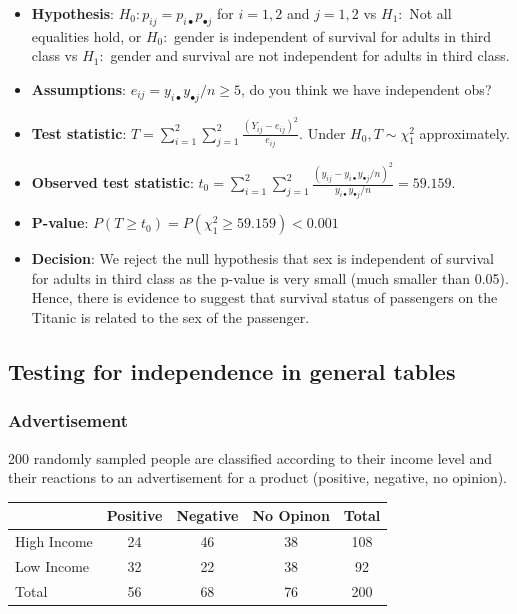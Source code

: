 \documentclass[a4paper]{article}
\begin{document}
\begin{itemize}
	\item \textbf{Hypothesis}: \( H_0: p_{ij} = p_{i \bullet} p_{\bullet j} \) for \( i = 1,2 \) and \( j = 1,2 \) vs \( H_1: \) Not all equalities hold, or \( H_0: \) gender is independent of survival for adults in third class vs \( H_1: \)  gender and survival are not independent for adults in third class. 
	\item \textbf{Assumptions}: \( e_{ij} =y_{i \bullet} y_{\bullet j}/n \geq 5 \), do you think we have independent obs?
	\item \textbf{Test statistic}: \( T = \sum\limits_{i=1}^{2}\sum\limits_{j=1}^{2} \frac{(Y_{ij} - e_{ij})^2}{e_{ij}} \). Under \( H_0, T \sim \chi^2_1 \) approximately.
	\item \textbf{Observed test statistic}: \( t_0 = \sum\limits_{i=1}^{2} \sum\limits_{j=1}^{2} \frac{(y_{ij} - y_{i \bullet}y_{\bullet j}/n)^2}{y_{i \bullet}y_{\bullet j}/n} = 59.159 \).
	\item \textbf{P-value}: \( P(T\geq t_0) = P(\chi^2_1 \geq 59.159) < 0.001 \)
	\item \textbf{Decision}: We reject the null hypothesis that sex is independent of survival for adults in third class as the p-value is very small (much smaller than 0.05). Hence, there is evidence to suggest that survival status of passengers on the Titanic is related to the sex of the passenger.
\end{itemize}
\subsection{Testing for independence in general tables}
\subsubsection{Advertisement}
200 randomly sampled people are classified according to their income level and their reactions to an advertisement for a product (positive, negative, no opinion).
\begin{table}[H]
	\centering
	\begin{tabular}{@{}lccc|c@{}}
	\toprule
				& Positive & Negative & No Opinon & Total \\ \midrule
	High Income & 24       & 46       & 38        & 108   \\
	Low Income  & 32       & 22       & 38        & 92    \\ \midrule
	Total		& 56       & 68       & 76        & 200   \\ \bottomrule
	\end{tabular}
\end{table}
\end{document}
